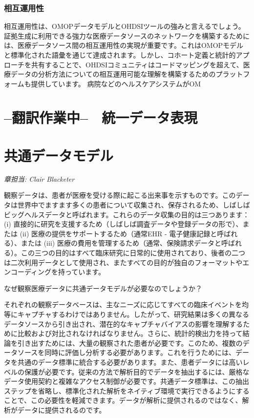 \documentclass[
  11pt]{book}
\theoremstyle{definition}
\theoremstyle{definition}
\theoremstyle{definition}
\theoremstyle{definition}
\theoremstyle{remark}
\begin{document}
\subsection{相互運用性}\label{ux76f8ux4e92ux904bux7528ux6027}

相互運用性は、OMOPデータモデルとOHDSIツールの強みと言えるでしょう。証拠生成に利用できる強力な医療データソースのネットワークを構築するためには、医療データソース間の相互運用性の実現が重要です。これはOMOPモデルと標準化された語彙を通じて達成されます。しかし、コホート定義と統計的アプローチを共有することで、OHDSIコミュニティはコードマッピングを超えて、医療データの分析方法についての相互運用可能な理解を構築するためのプラットフォームも提供しています。
病院などのヘルスケアシステムがOM

\chapter*{--翻訳作業中--　統一データ表現}\label{ux7ffbux8a33ux4f5cux696dux4e2d-ux7d71ux4e00ux30c7ux30fcux30bfux8868ux73fe}

\chapter{共通データモデル}\label{CommonDataModel}

\emph{章担当: Clair Blacketer}

観察データは、患者が医療を受ける際に起こる出来事を示すものです。このデータは世界中でますます多くの患者について収集され、保存されるため、しばしばビッグヘルスデータと呼ばれます。これらのデータ収集の目的は三つあります：(i) 直接的に研究を支援するため（しばしば調査データや登録データの形で）、または (ii) 医療の提供をサポートするため（通常EHR - 電子健康記録と呼ばれる）、または (iii) 医療の費用を管理するため（通常、保険請求データと呼ばれる）。この三つの目的はすべて臨床研究に日常的に使用されており、後者の二つは二次利用データとして使用され、またすべての目的が独自のフォーマットやエンコーディングを持っています。   

なぜ観察医療データに共通データモデルが必要なのでしょうか？

それぞれの観察データベースは、主なニーズに応じてすべての臨床イベントを均等にキャプチャするわけではありません。したがって、研究結果は多くの異なるデータソースから引き出され、潜在的なキャプチャバイアスの影響を理解するために比較および対比されなければなりません。さらに、統計的検出力を持って結論を引き出すためには、大量の観察された患者が必要です。このため、複数のデータソースを同時に評価し分析する必要があります。これを行うためには、データを共通のデータ標準に統合する必要があります。また、患者データには高いレベルの保護が必要です。従来の方法で解析目的でデータを抽出するには、厳格なデータ使用契約と複雑なアクセス制御が必要です。共通データ標準は、この抽出ステップを省略し、標準化された解析をネイティブ環境で実行できるようにすることで、この必要性を軽減できます。データが解析に提供されるのではなく、解析がデータに提供されるのです。
\end{document}
